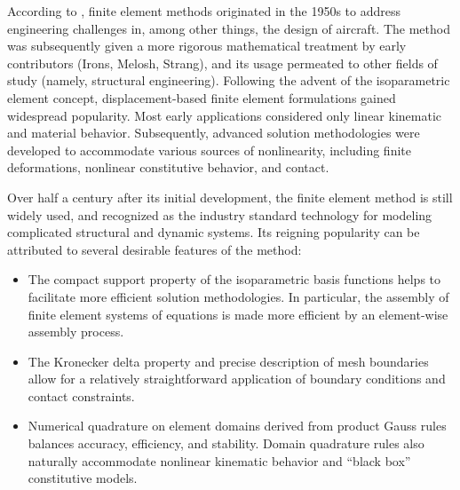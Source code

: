 	According to \cite{Felippa:04}, finite element methods originated in the 1950s to address engineering challenges in, among other things, the design of aircraft. The method was subsequently given a more rigorous mathematical treatment by early contributors (Irons, Melosh, Strang), and its usage permeated to other fields of study (namely, structural engineering). Following the advent of the isoparametric element concept, displacement-based finite element formulations gained widespread popularity. Most early applications considered only linear kinematic and material behavior.
	Subsequently, advanced solution methodologies were developed to accommodate various sources of nonlinearity, including finite deformations, nonlinear constitutive behavior, and contact.

	Over half a century after its initial development, the finite element method is still widely used, and recognized as the industry standard technology for modeling complicated structural and dynamic systems. Its reigning popularity can be attributed to several desirable features of the method:
	\begin{itemize}
		\item The compact support property of the isoparametric basis functions helps to facilitate more efficient solution methodologies. In particular, the assembly of finite element systems of equations is made more efficient by an element-wise assembly process.
		\item The Kronecker delta property and precise description of mesh boundaries allow for a relatively straightforward application of boundary conditions and contact constraints.
		\item Numerical quadrature on element domains derived from product Gauss rules balances accuracy, efficiency, and stability. Domain quadrature rules also naturally accommodate nonlinear kinematic behavior and ``black box'' constitutive models.
	\end{itemize}	
	
